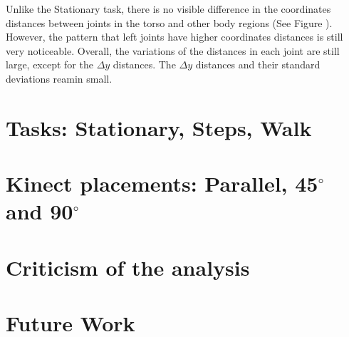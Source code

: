 Unlike the Stationary task, there is no visible difference in the coordinates distances between joints in the torso and other body regions (See Figure ). However, the pattern that left joints have higher coordinates distances is still very noticeable. Overall, the variations of the distances in each joint are still large, except for the $\Delta y$ distances. The $\Delta y$ distances and their standard deviations reamin small.



\section{Tasks: Stationary, Steps, Walk}
\label{sec:discussion_stationary}


\section{Kinect placements: Parallel, 45$^{\circ}$ and 90$^{\circ}$}
\label{sec:discussion_stationary}

\section{Criticism of the analysis}

\section{Future Work}
\label{sec:discussion_future_Work}


